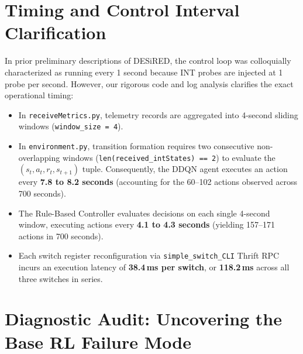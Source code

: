 \documentclass[12pt,a4paper,oneside]{report}
\begin{document}
\section{Timing and Control Interval Clarification}
In prior preliminary descriptions of DESiRED, the control loop was colloquially characterized as running every 1 second because INT probes are injected at 1 probe per second. However, our rigorous code and log analysis clarifies the exact operational timing:
\begin{itemize}
  \item In \texttt{receiveMetrics.py}, telemetry records are aggregated into 4-second sliding windows (\texttt{window\_size = 4}).
  \item In \texttt{environment.py}, transition formation requires two consecutive non-overlapping windows (\texttt{len(received\_intStates) == 2}) to evaluate the $(s_t, a_t, r_t, s_{t+1})$ tuple. Consequently, the DDQN agent executes an action every \textbf{7.8 to 8.2 seconds} (accounting for the 60--102 actions observed across 700 seconds).
  \item The Rule-Based Controller evaluates decisions on each single 4-second window, executing actions every \textbf{4.1 to 4.3 seconds} (yielding 157--171 actions in 700 seconds).
  \item Each switch register reconfiguration via \texttt{simple\_switch\_CLI} Thrift RPC incurs an execution latency of \textbf{38.4\,ms per switch}, or \textbf{118.2\,ms} across all three switches in series.
\end{itemize}

\section{Diagnostic Audit: Uncovering the Base RL Failure Mode}
\end{document}
